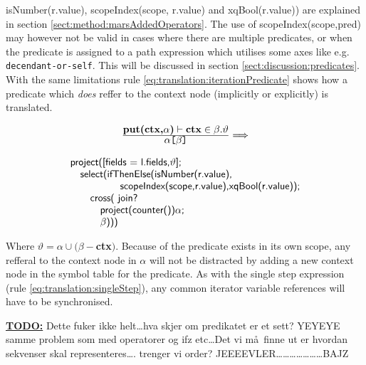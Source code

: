 \textsf{isNumber(r.value), scopeIndex(scope, r.value)} and \textsf{xqBool(r.value))} are explained in section
\ref{sect:method:marsAddedOperators}. The use of \textsf{scopeIndex(scope,pred)} may however not be valid in cases
where there are multiple predicates, or when the predicate is assigned to a path expression which utilises some
axes like e.g. \texttt{decendant-or-self}. This will be discussed in section \ref{sect:discussion:predicates}.
With the same limitations rule \ref{eq:translation:iterationPredicate} shows how a predicate which \emph{does}
reffer to the context node (implicitly or explicitly) is translated.

\begin{equation}
\centering
\begin{array}{c}
	\frac{\displaystyle \textbf{put(ctx,}\alpha\textbf{)}\vdash\textbf{ctx}\in\beta.\vartheta}
	{\displaystyle \alpha\texttt{[}\beta\texttt{]}}

	\Longrightarrow 
	\\
	\mbox{}
	\\
	\begin{array}{l}
		\mbox{\textsf{project([fields = l.fields,}} \vartheta \mbox{\textsf{];}} 
		\\ \quad \mbox{\textsf{select(ifThenElse(isNumber(r.value),}} \\ \quad 
		\qquad\qquad \mbox{\textsf{scopeIndex(scope,r.value),xqBool(r.value));}} \\ \quad\quad
		\mbox{\textsf{cross( join?}} \\ \quad\quad\quad
		\mbox{\textsf{project(counter())}}\alpha \textsf{;} \\ \quad\quad\quad
		\beta \mbox{\textsf{)))}}
	\end{array}
\end{array}
\label{eq:translation:iterationPredicate}
\end{equation}

Where $\vartheta = \alpha \cup (\beta -$\textbf{ctx}$)$. Because of the predicate exists in its own scope, any
refferal to the context node in $\alpha$ will not be distracted by adding a new context node in the symbol table
for the predicate. As with the single step expression (rule \ref{eq:translation:singleStep}), any common iterator
variable references will have to be synchronised.

\textbf{\underline{\Large TODO:}} Dette fuker ikke helt\ldots hva skjer om predikatet er et sett? YEYEYE samme
problem som med operatorer og ifz etc\ldots Det vi m\aa~finne ut er hvordan sekvenser skal representeres\ldots.
trenger vi order? JEEEEVLER\ldots\ldots\ldots\ldots\ldots\ldots\ldots  BAJZ



